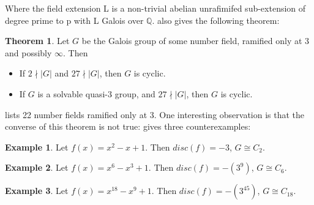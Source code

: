 \documentclass[12pt]{extarticle}
\newcommand{\<}{\langle}
\renewcommand{\>}{\rangle}
\theoremstyle{definition}
\newtheorem{theorem}{Theorem}
\newtheorem*{example}{Example}
\begin{document}
\par
Where the field extension L is a non-trivial abelian unrafimifed sub-extension of degree prime to p with L Galois over $\mathbb{Q}$.
\cite{HOEL} also gives the following theorem: 
\begin{theorem}
Let $G$ be the Galois group of some number field, ramified only at 3 and possibly $\infty$. Then \begin{itemize}
\item If $2 \nmid |G|$ and $ 27 \nmid |G|$, then $G$ is cyclic.
\item If $G$ is a solvable quasi-3 group, and $ 27 \nmid |G|$, then $G$ is cyclic.
\end{itemize}
\end{theorem}
\cite{JONE2} lists 22 number fields ramified only at 3. One interesting observation is that the converse of this theorem is not true: \cite{JONE2} gives three counterexamples: 
\begin{example}
Let $f(x) = x^2-x+1$. Then $disc(f) = -3$, $G \cong C_2$.
\end{example}
\begin{example}
Let $f(x) = x^6-x^3+1$. Then $disc(f) = -(3^9)$, $G \cong C_6$.
\end{example}
\begin{example}
Let $f(x) = x^{18}-x^9+1$. Then $disc(f) = -(3^{45})$, $G \cong C_{18}$.
\end{example}
\end{document}
